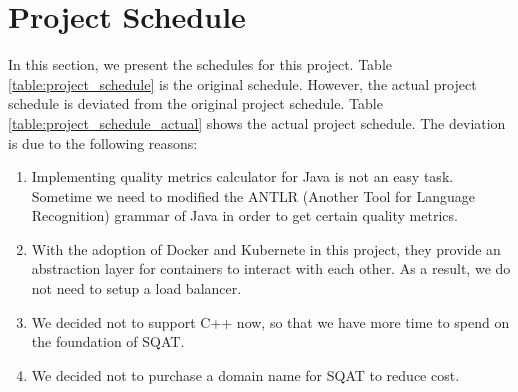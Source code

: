 \section{Project Schedule}

In this section, we present the schedules for this project. Table \ref{table:project_schedule} is the original schedule. However, the actual project schedule is deviated from the original project schedule. Table \ref{table:project_schedule_actual} shows the actual project schedule. The deviation is due to the following reasons:

\begin{enumerate}
    \item Implementing quality metrics calculator for Java is not an easy task. Sometime we need to modified the ANTLR (Another Tool for Language Recognition) grammar of Java in order to get certain quality metrics.
    \item With the adoption of Docker and Kubernete in this project, they provide an abstraction layer for containers to interact with each other. As a result, we do not need to setup a load balancer.
    \item We decided not to support C++ now, so that we have more time to spend on the foundation of SQAT. 
    \item We decided not to purchase a domain name for SQAT to reduce cost. 
\end{enumerate}

